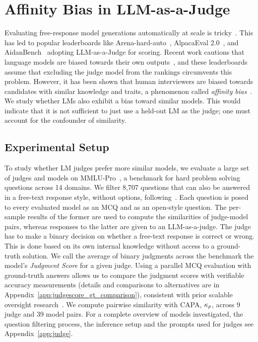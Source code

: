 \section{Affinity Bias in LLM-as-a-Judge}
\label{sec:AI_Judges}

Evaluating free-response model generations automatically at scale is tricky~\citep{biderman2024lessonstrenchesreproducibleevaluation}. This has led to popular leaderboards like Arena-hard-auto~\citep{li2024crowdsourceddatahighqualitybenchmarks}, AlpacaEval 2.0~\citep{dubois2024length}, and AidanBench~\citep{mclaughlin2025aidanbench} adopting LLM-as-a-Judge for scoring. Recent work cautions that language models are biased towards their own outputs~\citep{liu-etal-2024-llms-narcissistic, panickssery2024llm}, and these leaderboards assume that excluding the judge model from the rankings circumvents this problem. However, it has been shown that human interviewers are biased towards candidates with similar knowledge and traits, a phenomenon called \textit{affinity bias}~\citep{bagues2012recruiters}. We study whether LMs also exhibit a bias toward similar models. This would indicate that it is not sufficient to just use a held-out LM as the judge; one must account for the confounder of similarity.

\subsection{Experimental Setup}

To study whether LM judges prefer more similar models, we evaluate a large set of judges and models on MMLU-Pro~\citep{wang2024mmlupro}, a benchmark for hard problem solving questions across 14 domains. We filter 8,707 questions that can also be answered in a free-text response style, without options, following~\citet{myrzakhan2024openllmleaderboard}. Each question is posed to every evaluated model as an MCQ and as an open-style question. The per-sample results of the former are used to compute the similarities of judge-model pairs, whereas responses to the latter are given to an LLM-as-a-judge. The judge has to make a binary decision on whether a free-text response is correct or wrong. This is done based on its own internal knowledge without access to a ground-truth solution. We call the average of binary judgments across the benchmark the model's \textit{Judgment Score} for a given judge. Using a parallel MCQ evaluation with ground-truth answers allows us to compare the judgment scores with verifiable accuracy measurements (details and comparisons to alternatives are in Appendix~\ref{app:judgescore_gt_comparison}), consistent with prior scalable oversight research~\citep{bowman2022measuringprogress}. We compute pairwise similarity with CAPA, $\kappa_{p}$, across 9 judge and 39 model pairs. For a complete overview of models investigated, the question filtering process, the inference setup and the prompts used for judges see Appendix~\ref{app:judge}. 

